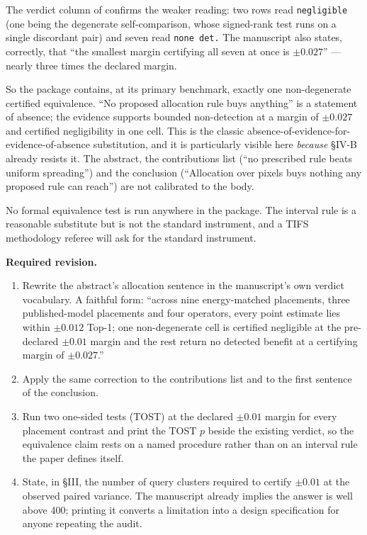 \documentclass[11pt,a4paper]{article}
\newcommand{\file}[1]{\path{#1}}
\newcommand{\action}{\par\textbf{Required revision.} }
\begin{document}
The verdict column of \file{tab\_placement\_msls.tex} confirms the weaker
reading: two rows read \texttt{negligible} (one being the degenerate
self-comparison, whose signed-rank test runs on a single discordant pair) and
seven read \texttt{none det.} The manuscript also states, correctly, that ``the
smallest margin certifying all seven at once is $\pm0.027$'' --- nearly three
times the declared margin.

So the package contains, at its primary benchmark, exactly one non-degenerate
certified equivalence. ``No proposed allocation rule buys anything'' is a
statement of absence; the evidence supports bounded non-detection at a margin
of $\pm0.027$ and certified negligibility in one cell. This is the classic
absence-of-evidence-for-evidence-of-absence substitution, and it is
particularly visible here \emph{because} \S IV-B already resists it. The
abstract, the contributions list (``no prescribed rule beats uniform
spreading'') and the conclusion (``Allocation over pixels buys nothing any
proposed rule can reach'') are not calibrated to the body.

No formal equivalence test is run anywhere in the package. The interval rule is
a reasonable substitute but is not the standard instrument, and a TIFS
methodology referee will ask for the standard instrument.

\action
\begin{enumerate}
\item Rewrite the abstract's allocation sentence in the manuscript's own
  verdict vocabulary. A faithful form: ``across nine energy-matched placements,
  three published-model placements and four operators, every point estimate
  lies within $\pm0.012$ Top-1; one non-degenerate cell is certified negligible
  at the pre-declared $\pm0.01$ margin and the rest return no detected benefit
  at a certifying margin of $\pm0.027$.''
\item Apply the same correction to the contributions list and to the first
  sentence of the conclusion.
\item Run two one-sided tests (TOST) at the declared $\pm0.01$ margin for every
  placement contrast and print the TOST $p$ beside the existing verdict, so the
  equivalence claim rests on a named procedure rather than on an interval rule
  the paper defines itself.
\item State, in \S III, the number of query clusters required to certify
  $\pm0.01$ at the observed paired variance. The manuscript already implies the
  answer is well above 400; printing it converts a limitation into a design
  specification for anyone repeating the audit.
\end{enumerate}
\end{document}
